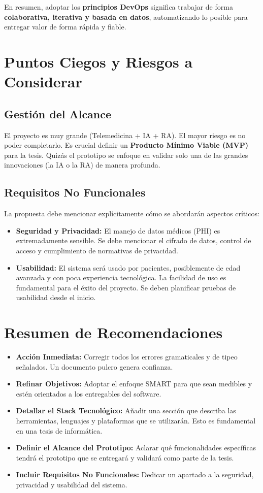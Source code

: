 \documentclass[12pt,a4paper]{article}
\begin{document}
En resumen, adoptar los \textbf{principios DevOps} significa trabajar de forma \textbf{colaborativa, iterativa y basada en datos}, automatizando lo posible para entregar valor de forma rápida y fiable.

\section{Puntos Ciegos y Riesgos a Considerar}

\subsection{Gestión del Alcance}
El proyecto es muy grande (Telemedicina + IA + RA). El mayor riesgo es no poder completarlo. Es crucial definir un \textbf{Producto Mínimo Viable (MVP)} para la tesis. Quizás el prototipo se enfoque en validar solo una de las grandes innovaciones (la IA o la RA) de manera profunda.

\subsection{Requisitos No Funcionales}
La propuesta debe mencionar explícitamente cómo se abordarán aspectos críticos:
\begin{itemize}
    \item \textbf{Seguridad y Privacidad:} El manejo de datos médicos (PHI) es extremadamente sensible. Se 
    debe mencionar el cifrado de datos, control de acceso y cumplimiento de normativas de privacidad.
    \item \textbf{Usabilidad:} El sistema será usado por pacientes, posiblemente de edad avanzada y con poca 
    experiencia tecnológica. La facilidad de uso es fundamental para el éxito del proyecto. 
    Se deben planificar pruebas de usabilidad desde el inicio.
\end{itemize}

\section{Resumen de Recomendaciones}
\begin{itemize}
    \item \textbf{Acción Inmediata:} Corregir todos los errores gramaticales y de tipeo señalados. Un 
    documento pulcro genera confianza.
    \item \textbf{Refinar Objetivos:} Adoptar el enfoque SMART para que sean medibles y estén orientados a 
    los entregables del software.
    \item \textbf{Detallar el Stack Tecnológico:} Añadir una sección que describa las herramientas, lenguajes 
    y plataformas que se utilizarán. Esto es fundamental en una tesis de informática.
    \item \textbf{Definir el Alcance del Prototipo:} Aclarar qué funcionalidades específicas tendrá el prototipo 
    que se entregará y validará como parte de la tesis.
    \item \textbf{Incluir Requisitos No Funcionales:} Dedicar un apartado a la seguridad, privacidad y 
    usabilidad del sistema.
\end{itemize}
\end{document}
